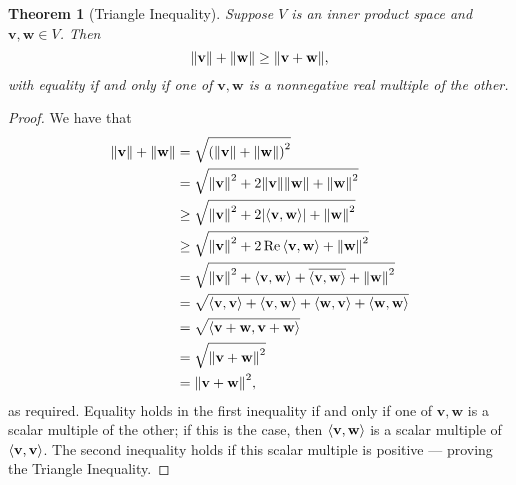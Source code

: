 \documentclass[11pt]{article}
\renewcommand{\vec}[1]{\mathbf{#1}}
\newcommand{\conjugate}[1]{\overline{#1}}
\newtheorem{theorem}{Theorem}
\begin{document}
\begin{adjustwidth}{0.5cm}{}
  \begin{theorem}[Triangle Inequality]
	  Suppose $V$ is an inner product space and $\vec{v}, \vec{w} \in V$. Then
	  \[
		  \norm{\vec{v}} + \norm{\vec{w}} \ge \norm{\vec{v} + \vec{w}},
	  \]
	  with equality if and only if one of $\vec{v}, \vec{w}$ is a nonnegative real multiple of the other.
  \end{theorem}
	\begin{proof}
		We have that
		\begin{align*}
			\norm{\vec{v}} + \norm{\vec{w}} &= \sqrt{\left( \norm{\vec{v}} + \norm{\vec{w}} \right)^{2}} \\
			&= \sqrt{\norm{\vec{v}}^{2} + 2 \norm{\vec{v}} \norm{\vec{w}} + \norm{\vec{w}}^{2}} \\
			&\ge \sqrt{\norm{\vec{v}}^{2} + 2 \abs{\ev{\vec{v}, \vec{w}}} + \norm{\vec{w}}^{2}} \\
			&\ge \sqrt{\norm{\vec{v}}^{2} + 2 \Re \ev{\vec{v}, \vec{w}} + \norm{\vec{w}}^{2}} \\
			&= \sqrt{\norm{\vec{v}}^{2} + \ev{\vec{v}, \vec{w}} + \conjugate{\ev{\vec{v}, \vec{w}}} + \norm{\vec{w}}^{2}} \\
			&= \sqrt{\ev{\vec{v}, \vec{v}} + \ev{\vec{v}, \vec{w}} + \ev{\vec{w}, \vec{v}} + \ev{\vec{w}, \vec{w}}} \\
			&= \sqrt{\ev{\vec{v} + \vec{w}, \vec{v} + \vec{w}}} \\
			&= \sqrt{\norm{\vec{v} + \vec{w}}^{2}} \\
			&= \norm{\vec{v} + \vec{w}}^{2},
		\end{align*}
		as required. Equality holds in the first inequality if and only if one of $\vec{v}, \vec{w}$ is a scalar multiple of the other; if this is the case, then $\ev{\vec{v}, \vec{w}}$ is a scalar multiple of $\ev{\vec{v}, \vec{v}}$. The second inequality holds if this scalar multiple is positive --- proving the Triangle Inequality.
	\end{proof}
\end{adjustwidth}
\end{document}
